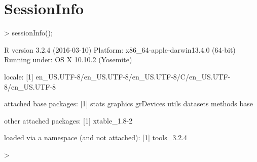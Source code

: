 \documentclass{article}
\begin{document}
\newpage
\section{SessionInfo}

\begin{Schunk}
\begin{Sinput}
> sessionInfo();
\end{Sinput}
\begin{Soutput}
R version 3.2.4 (2016-03-10)
Platform: x86_64-apple-darwin13.4.0 (64-bit)
Running under: OS X 10.10.2 (Yosemite)

locale:
[1] en_US.UTF-8/en_US.UTF-8/en_US.UTF-8/C/en_US.UTF-8/en_US.UTF-8

attached base packages:
[1] stats     graphics  grDevices utils     datasets  methods   base     

other attached packages:
[1] xtable_1.8-2

loaded via a namespace (and not attached):
[1] tools_3.2.4
\end{Soutput}
\begin{Sinput}
> 
\end{Sinput}
\end{Schunk}
\end{document}
